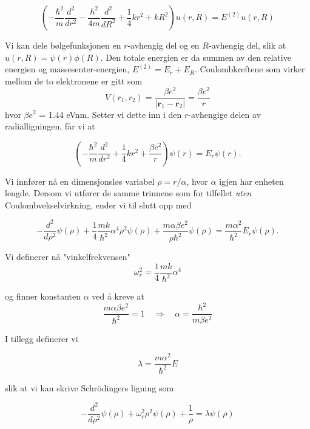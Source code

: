 \documentclass{article}
\begin{document}
\begin{equation}
\left(  -\frac{\hbar^2}{m} \frac{d^2}{dr^2} -\frac{\hbar^2}{4 m} \frac{d^2}{dR^2}+ \frac{1}{4} k r^2+  kR^2\right)u(r,R)  = E^{(2)} u(r,R)
\end{equation}

Vi kan dele bølgefunksjonen en $r$-avhengig del og en $R$-avhengig del, slik at $u(r,R) = \psi (r) \phi (R) $. Den totale energien er da summen av den relative energien og massesenter-energien, $E^{(2)} = E_r + E_R$. Coulombkreftene som virker mellom de to elektronene er gitt som
\begin{equation}
V(r_1, r_2) = \frac{\beta e^2}{|\textbf{r}_1 - \textbf{r}_2|} = \frac{\beta e^2}{r}
\end{equation}
hvor $\beta e^2$ = 1.44 eVnm. Setter vi dette inn i den $r$-avhengige delen av radialligningen, får vi at

\begin{equation*}
\left(  -\frac{\hbar^2}{m} \frac{d^2}{dr^2}+ \frac{1}{4}k r^2+\frac{\beta e^2}{r}\right)\psi(r)  = E_r \psi(r).
\end{equation*}

Vi innfører nå en dimensjonsløs variabel $\rho = r/ \alpha$, hvor $\alpha$ igjen har enheten lengde. Dersom vi utfører de samme trinnene som for tilfellet \textit{uten} Coulombvekselvirkning, ender vi til slutt opp med

\begin{equation*}
  -\frac{d^2}{d\rho^2} \psi(\rho) 
       + \frac{1}{4}\frac{mk}{\hbar^2} \alpha^4\rho^2\psi(\rho)+\frac{m\alpha \beta e^2}{\rho\hbar^2}\psi(\rho)  = 
\frac{m\alpha^2}{\hbar^2}E_r \psi(\rho) .
\end{equation*}

Vi definerer nå "vinkelfrekvensen"
\[\omega_r^2 = \frac{1}{4}\frac{mk}{\hbar ^2}\alpha^4 \]

og finner konstanten $\alpha$ ved å kreve at 
\[\frac{m\alpha \beta e^2}{\hbar ^2} = 1 \quad \Rightarrow \quad \alpha = \frac{\hbar ^2}{m\beta e^2}  \]

I tillegg definerer vi 

\[\lambda = \frac{m\alpha ^2}{\hbar ^2}E \]

slik at vi kan skrive Schrödingers ligning som

\begin{equation*}
  -\frac{d^2}{d\rho^2} \psi(\rho) + \omega_r^2\rho^2\psi(\rho) +\frac{1}{\rho} = \lambda \psi(\rho)
\end{equation*}
\end{document}

